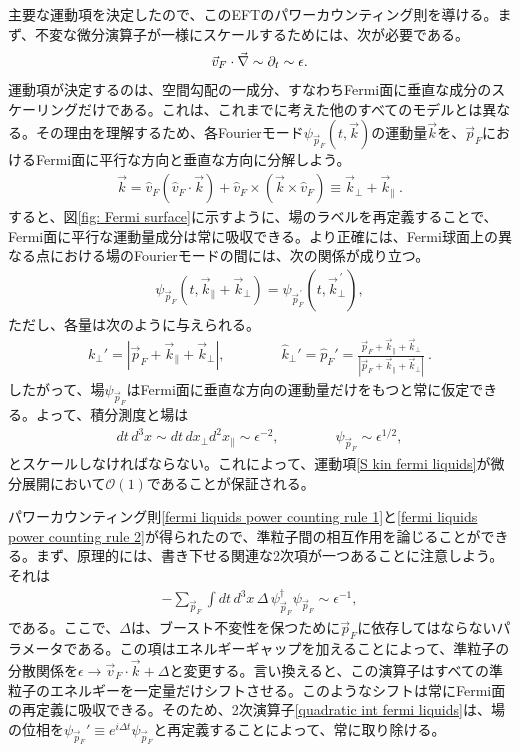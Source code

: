 主要な運動項を決定したので、このEFTのパワーカウンティング則を導ける。まず、不変な微分演算子が一様にスケールするためには、次が必要である。
%
\begin{align} \label{fermi liquids power counting rule 1}
	\vec v_F \cdot \vec \nabla \sim \partial_t \sim \epsilon.
\end{align}
%
運動項が決定するのは、空間勾配の一成分、すなわちFermi面に垂直な成分のスケーリングだけである。これは、これまでに考えた他のすべてのモデルとは異なる。その理由を理解するため、各Fourierモード$\psi_{{\vec p}_F} (t , \vec k)$の運動量$\vec k$を、$\vec p_F$におけるFermi面に平行な方向と垂直な方向に分解しよう。
%
\begin{align}
	\vec k = \hat v_F (\hat v_F \cdot \vec k ) + \hat v_F \times ( \vec k \times \hat v_F) \equiv \vec k_\perp + \vec k_\parallel \ .
\end{align}
%
すると、図\ref{fig: Fermi surface}に示すように、場のラベルを再定義することで、Fermi面に平行な運動量成分は常に吸収できる。より正確には、Fermi球面上の異なる点における場のFourierモードの間には、次の関係が成り立つ。
%
\begin{align}
	\psi_{\vec p_F} (t, \vec k_\parallel + \vec k_\perp) = \psi_{\vec p_F^{\, \prime}} (t, \vec k_\perp^{\, \prime}), 
\end{align}
%
ただし、各量は次のように与えられる。
%
%
\begin{align}
	k_\perp' = | \vec p_F + \vec k_\parallel + \vec k_\perp|, \qquad \qquad \hat k_\perp' = \hat p_F' = \frac{\vec p_F + \vec k_\parallel + \vec k_\perp}{| \vec p_F + \vec k_\parallel + \vec k_\perp|} \ .
\end{align}
%
したがって、場$\psi_{\vec p_F}$はFermi面に垂直な方向の運動量だけをもつと常に仮定できる。よって、積分測度と場は
%
\begin{align} \label{fermi liquids power counting rule 2}
	dt\,  d^3 x \sim d t \, d x_\perp d^2 x_\parallel \sim \epsilon^{-2}, \qquad \qquad \psi_{\vec p_F} \sim \epsilon^{1/2}, 
\end{align}
%
とスケールしなければならない。これによって、運動項\eqref{S kin fermi liquids}が微分展開において$\mathcal{O}(1)$であることが保証される。

パワーカウンティング則\eqref{fermi liquids power counting rule 1}と\eqref{fermi liquids power counting rule 2}が得られたので、準粒子間の相互作用を論じることができる。まず、原理的には、書き下せる関連な2次項が一つあることに注意しよう。それは
%
\begin{align} \label{quadratic int fermi liquids}
	-  \sum_{\vec p_F} \int dt \, d^3 x \, \Delta \, \psi_{\vec p_F}^\dag  \psi_{\vec p_F} \sim \epsilon^{-1} , 
\end{align}
% 
である。ここで、$\Delta$は、ブースト不変性を保つために$\vec p_F$に依存してはならないパラメータである。この項はエネルギーギャップを加えることによって、準粒子の分散関係を$\epsilon \to \vec v_F \cdot \vec k + \Delta$と変更する。言い換えると、この演算子はすべての準粒子のエネルギーを一定量だけシフトさせる。このようなシフトは常にFermi面の再定義に吸収できる。そのため、2次演算子\eqref{quadratic int fermi liquids}は、場の位相を$\psi_{\vec p_F}' \equiv e^{i \Delta t} \psi_{\vec p_F}$と再定義することによって、常に取り除ける。

